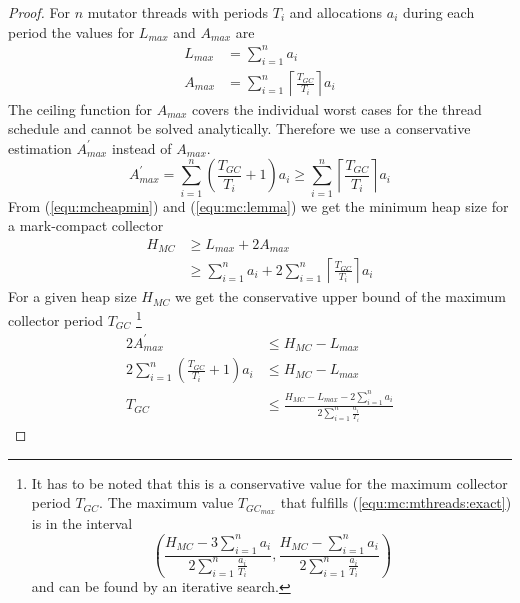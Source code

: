 \begin{proof}

For $n$ mutator threads with periods $T_i$ and allocations $a_i$
during each period the values for $L_{max}$ and $A_{max}$ are
%
\begin{align}\label{nth:lmax}
    L_{max} & = \sum_{i=1}^{n} a_i\\
    A_{max} & = \sum_{i=1}^{n}
    \left\lceil\frac{T_{GC}}{T_i}\right\rceil a_i
\end{align}
%
The ceiling function for $A_{max}$ covers the individual worst cases
for the thread schedule and cannot be solved analytically. Therefore
we use a conservative estimation $A^{'}_{max}$ instead of $A_{max}$.
%
\begin{equation}
    A^{'}_{max} = \sum_{i=1}^{n} \left(\frac{T_{GC}}{T_i}+1\right)
    a_i
    \ge \sum_{i=1}^{n} \left\lceil\frac{T_{GC}}{T_i}\right\rceil a_i
\end{equation}
%
From (\ref{equ:mcheapmin}) and (\ref{equ:mc:lemma}) we get the
minimum heap size for a mark-compact collector
\begin{align}
\nonumber
    \label{equ:mc:mthreads:exact}
    H_{MC} & \ge L_{max} + 2 A_{max}\\
           & \ge \sum_{i=1}^{n} a_i + 2 \sum_{i=1}^{n}
             \left\lceil\frac{T_{GC}}{T_i}\right\rceil a_i
\end{align}
%
For a given heap size $H_{MC}$ we get the conservative upper bound
of the maximum collector period $T_{GC}$
%
\footnote{It has to be noted that this is a conservative value for
the maximum collector period $T_{GC}$. The maximum value
$T_{GC_{max}}$ that fulfills (\ref{equ:mc:mthreads:exact}) is in the
interval
%
\begin{equation}
\nonumber
    \left(\frac{H_{MC} - 3\sum_{i=1}^{n} a_i} {2\sum_{i=1}^{n}
        \frac{a_i}{T_i}},
        \frac{H_{MC} - \sum_{i=1}^{n} a_i} {2\sum_{i=1}^{n}
        \frac{a_i}{T_i}}\right)
\end{equation}
%
and can be found by an iterative search.}
%
\begin{align}
\nonumber
        2 A^{'}_{max} & \le H_{MC}-L_{max}
\\
        2\sum_{i=1}^{n} \left(\frac{T_{GC}}{T_i}+1\right) a_i
        & \le H_{MC}-L_{max}
\\
        T_{GC}
        & \le \frac{H_{MC}-L_{max} - 2\sum_{i=1}^{n} a_i}
        {2\sum_{i=1}^{n} \frac{a_i}{T_i}}
\end{align}
%
\begin{equation}

\end{equation}
\end{proof}
